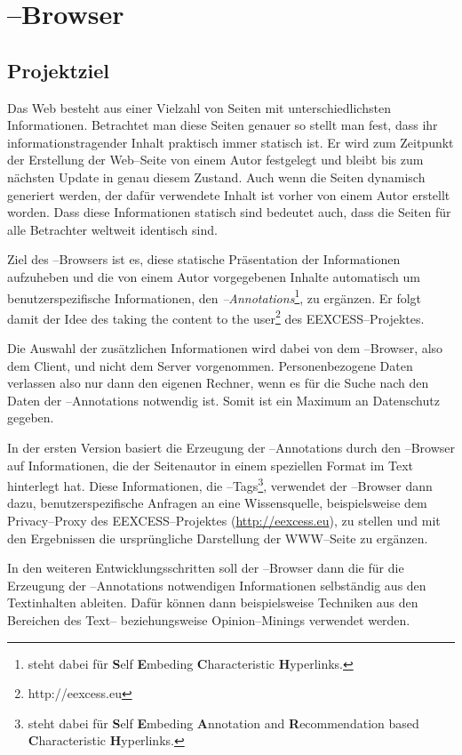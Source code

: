 \chapter{\SECH--Browser}

\section{Projektziel}
Das Web besteht aus einer Vielzahl von Seiten mit unterschiedlichsten
Informationen. Betrachtet man diese Seiten genauer so stellt man fest,
dass ihr informationstragender Inhalt praktisch immer statisch ist.
Er wird zum Zeitpunkt der Erstellung der Web--Seite von einem Autor
festgelegt und bleibt bis zum nächsten Update in genau diesem
Zustand. Auch wenn die Seiten dynamisch generiert werden, der dafür
verwendete Inhalt ist vorher von einem Autor erstellt worden. Dass
diese Informationen statisch sind bedeutet auch, dass die Seiten für
alle Betrachter weltweit identisch sind.

Ziel des \SECH--Browsers ist es, diese statische Präsentation der
Informationen aufzuheben und die von einem Autor vorgegebenen Inhalte
automatisch um benutzerspezifische Informationen, den
\emph{\SECH--Annotations}\footnote{\SECH steht dabei für \textbf{S}elf
  \textbf{E}mbeding \textbf{C}haracteristic \textbf{H}yperlinks.}, zu
ergänzen. Er folgt damit der Idee des \glqq taking the content to the
user\grqq\footnote{http://eexcess.eu} des EEXCESS--Projektes.

Die Auswahl der zusätzlichen Informationen wird dabei von dem
\SECH--Browser, also dem Client, und nicht dem Server
vorgenommen. Personenbezogene Daten verlassen also nur dann den
eigenen Rechner, wenn es für die Suche nach den Daten der
\SECH--Annotations notwendig ist. Somit ist ein Maximum an
Datenschutz gegeben.

In der ersten Version basiert die Erzeugung der \SECH--Annotations
durch den \SECH--Browser auf Informationen, die der Seitenautor in
einem speziellen Format im Text hinterlegt hat. Diese Informationen,
die \SEARCH--Tags\footnote{\SEARCH steht dabei für \textbf{S}elf
  \textbf{E}mbeding \textbf{A}nnotation and \textbf{R}ecommendation based \textbf{C}haracteristic \textbf{H}yperlinks.}, verwendet der \SECH--Browser dann dazu, benutzerspezifische
Anfragen an eine Wissensquelle, beispielsweise dem Privacy--Proxy des
EEXCESS--Projektes (\url{http://eexcess.eu}), zu stellen und mit den
Ergebnissen die ursprüngliche Darstellung der WWW--Seite zu
ergänzen. 

In den weiteren Entwicklungsschritten soll der \SECH--Browser dann die
für die Erzeugung der \SECH--Annotations notwendigen Informationen
selbständig aus den Textinhalten ableiten. Dafür können dann
beispielsweise Techniken aus den Bereichen des Text-- beziehungsweise
Opinion--Minings verwendet werden.

